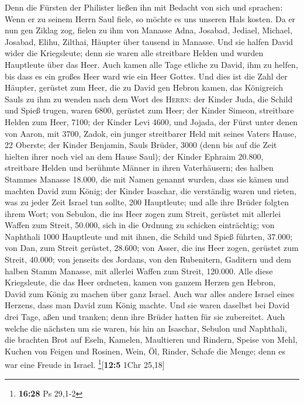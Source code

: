 Denn die Fürsten der Philister ließen ihn mit Bedacht von sich und
sprachen: Wenn er zu seinem Herrn Saul fiele, so möchte es uns unseren
Hals kosten.  Da er nun gen Ziklag zog, fielen zu ihm von
Manasse Adna, Josabad, Jediael, Michael, Josabad, Elihu, Zilthai,
Häupter über tausend in Manasse.  Und sie halfen David
wider die Kriegsleute; denn sie waren alle streitbare Helden und wurden
Hauptleute über das Heer.  Auch kamen alle Tage etliche
zu David, ihm zu helfen, bis dass es ein großes Heer ward wie ein Heer
Gottes.  Und dies ist die Zahl der Häupter, gerüstet zum
Heer, die zu David gen Hebron kamen, das Königreich Sauls zu ihm zu
wenden nach dem Wort des \textsc{Herrn}:  der Kinder
Juda, die Schild und Spieß trugen, waren 6800, gerüstet zum Heer;
 der Kinder Simeon, streitbare Helden zum Heer, 7100;
 der Kinder Levi 4600,  und Jojada, der
Fürst unter denen von Aaron, mit 3700,  Zadok, ein junger
streitbarer Held mit seines Vaters Hause, 22 Oberste; 
der Kinder Benjamin, Sauls Brüder, 3000 (denn bis auf die Zeit hielten
ihrer noch viel an dem Hause Saul);  der Kinder Ephraim
20.800, streitbare Helden und berühmte Männer in ihren Vaterhäusern;
 des halben Stammes Manasse 18.000, die mit Namen genannt
wurden, dass sie kämen und machten David zum König;  der
Kinder Isaschar, die verständig waren und rieten, was zu jeder Zeit
Israel tun sollte, 200 Hauptleute; und alle ihre Brüder folgten ihrem
Wort;  von Sebulon, die ins Heer zogen zum Streit,
gerüstet mit allerlei Waffen zum Streit, 50.000, sich in die Ordnung zu
schicken einträchtig;  von Naphthali 1000 Hauptleute und
mit ihnen, die Schild und Spieß führten, 37.000;  von
Dan, zum Streit gerüstet, 28.600;  von Asser, die ins
Heer zogen, gerüstet zum Streit, 40.000;  von jenseits
des Jordans, von den Rubenitern, Gaditern und dem halben Stamm Manasse,
mit allerlei Waffen zum Streit, 120.000.  Alle diese
Kriegsleute, die das Heer ordneten, kamen von ganzem Herzen gen Hebron,
David zum König zu machen über ganz Israel. Auch war alles andere Israel
eines Herzens, dass man David zum König machte.  Und sie
waren daselbst bei David drei Tage, aßen und tranken; denn ihre Brüder
hatten für sie zubereitet.  Auch welche die nächsten um
sie waren, bis hin an Isaschar, Sebulon und Naphthali, die brachten Brot
auf Eseln, Kamelen, Maultieren und Rindern, Speise von Mehl, Kuchen von
Feigen und Rosinen, Wein, Öl, Rinder, Schafe die Menge; denn es war eine
Freude in Israel. \footnote{\textbf{16:28} Ps 29,1-2}{[}\textbf{12:5}
1Chr 25,18{]}

